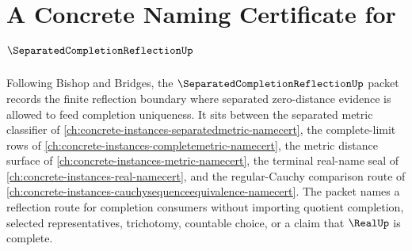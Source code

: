 \chapter{A Concrete Naming Certificate for $\SeparatedCompletionReflectionUp$}
\label{ch:concrete-instances-separated-completion-reflection-namecert}

Following Bishop and Bridges, the $\SeparatedCompletionReflectionUp$ packet records the finite reflection boundary where separated zero-distance evidence is allowed to feed completion uniqueness. It sits between the separated metric classifier of \autoref{ch:concrete-instances-separatedmetric-namecert}, the complete-limit rows of \autoref{ch:concrete-instances-completemetric-namecert}, the metric distance surface of \autoref{ch:concrete-instances-metric-namecert}, the terminal real-name seal of \autoref{ch:concrete-instances-real-namecert}, and the regular-Cauchy comparison route of \autoref{ch:concrete-instances-cauchysequenceequivalence-namecert}. The packet names a reflection route for completion consumers without importing quotient completion, selected representatives, trichotomy, countable choice, or a claim that $\RealUp$ is complete.

